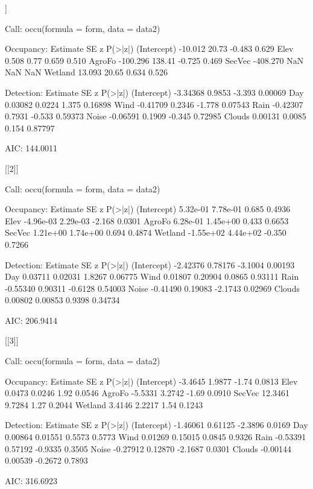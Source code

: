 \documentclass[article]{jss}
\begin{document}
\begin{CodeOutput}
[[1]]

Call:
occu(formula = form, data = data2)

Occupancy:
            Estimate     SE      z P(>|z|)
(Intercept)  -10.012  20.73 -0.483   0.629
Elev           0.508   0.77  0.659   0.510
AgroFo      -100.296 138.41 -0.725   0.469
SecVec      -408.270    NaN    NaN     NaN
Wetland       13.093  20.65  0.634   0.526

Detection:
            Estimate     SE      z P(>|z|)
(Intercept) -3.34368 0.9853 -3.393 0.00069
Day          0.03082 0.0224  1.375 0.16898
Wind        -0.41709 0.2346 -1.778 0.07543
Rain        -0.42307 0.7931 -0.533 0.59373
Noise       -0.06591 0.1909 -0.345 0.72985
Clouds       0.00131 0.0085  0.154 0.87797

AIC: 144.0011 

[[2]]

Call:
occu(formula = form, data = data2)

Occupancy:
             Estimate       SE      z P(>|z|)
(Intercept)  5.32e-01 7.78e-01  0.685  0.4936
Elev        -4.96e-03 2.29e-03 -2.168  0.0301
AgroFo       6.28e-01 1.45e+00  0.433  0.6653
SecVec       1.21e+00 1.74e+00  0.694  0.4874
Wetland     -1.55e+02 4.44e+02 -0.350  0.7266

Detection:
            Estimate      SE       z P(>|z|)
(Intercept) -2.42376 0.78176 -3.1004 0.00193
Day          0.03711 0.02031  1.8267 0.06775
Wind         0.01807 0.20904  0.0865 0.93111
Rain        -0.55340 0.90311 -0.6128 0.54003
Noise       -0.41490 0.19083 -2.1743 0.02969
Clouds       0.00802 0.00853  0.9398 0.34734

AIC: 206.9414 

[[3]]

Call:
occu(formula = form, data = data2)

Occupancy:
            Estimate     SE     z P(>|z|)
(Intercept)  -3.4645 1.9877 -1.74  0.0813
Elev          0.0473 0.0246  1.92  0.0546
AgroFo       -5.5331 3.2742 -1.69  0.0910
SecVec       12.3461 9.7284  1.27  0.2044
Wetland       3.4146 2.2217  1.54  0.1243

Detection:
            Estimate      SE       z P(>|z|)
(Intercept) -1.46061 0.61125 -2.3896  0.0169
Day          0.00864 0.01551  0.5573  0.5773
Wind         0.01269 0.15015  0.0845  0.9326
Rain        -0.53391 0.57192 -0.9335  0.3505
Noise       -0.27912 0.12870 -2.1687  0.0301
Clouds      -0.00144 0.00539 -0.2672  0.7893

AIC: 316.6923 


\end{CodeOutput}
\end{document}
